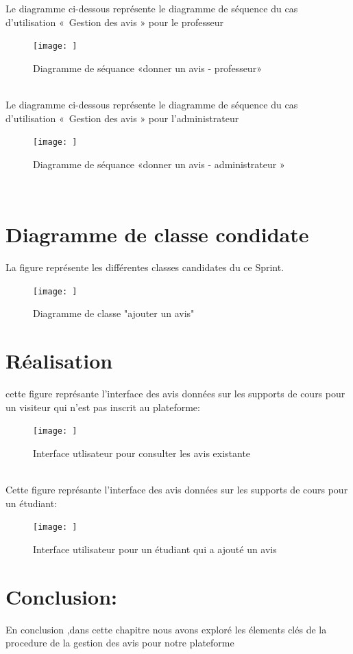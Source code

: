 Le diagramme ci-dessous représente le diagramme de séquence du cas d’utilisation « Gestion des avis » pour le professeur 
\begin{figure}[h!]
    \centering
    \texttt{[image: ]}
    \caption{Diagramme de séquance «donner un avis - professeur»}
    \label{fig:enter-label}
\end{figure}
\\


Le diagramme ci-dessous représente le diagramme de séquence du cas d’utilisation « Gestion des avis » pour l'administrateur 
\begin{figure}[h!]
    \centering
    \texttt{[image: ]}
    \caption{Diagramme de séquance «donner un avis - administrateur »}
    \label{fig:enter-label}
\end{figure}
\\


\section{Diagramme de classe condidate}
La figure  représente les différentes classes candidates du ce Sprint.
\begin{figure}[h!]
    \centering
    \texttt{[image: ]}
    \caption{Diagramme de classe "ajouter un avis"}
    \label{fig:enter-label}
\end{figure}

\section{Réalisation}
cette figure représante l'interface des avis données sur les supports de cours pour un visiteur qui n'est pas inscrit au plateforme:

\begin{figure}[h!]
    \centering
    \texttt{[image: ]}
    \caption{Interface utlisateur pour consulter les avis existante}
    \label{fig:enter-label}
\end{figure}
\\

Cette figure représante l'interface des avis données sur les supports de cours pour un étudiant:
\begin{figure}[h!]
    \centering
    \texttt{[image: ]}
    \caption{Interface utilisateur pour un étudiant qui a ajouté un avis}
    \label{fig:enter-label}
\end{figure}


\section{Conclusion:}
En conclusion ,dans cette chapitre nous avons exploré les élements clés de la procedure de la gestion des avis pour notre plateforme